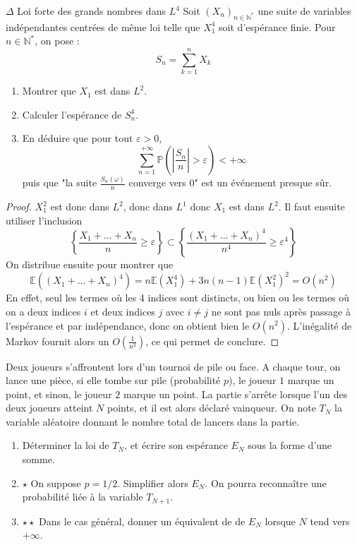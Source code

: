 \documentclass[french,a4paper]{article}
\renewcommand{\P}{\mathbb{P}}
\newcommand{\N}{\mathbb{N}}
\newcommand{\st}{^*}
\newcommand{\E}{\mathbb{E}}
\theoremstyle{plain}
\theoremstyle{definition}
\theoremstyle{remark}
\begin{document}
\begin{ex}[Moulin.81]{$\Delta$ Loi forte des grands nombres dans $L^4$}
	Soit $(X_n)_{n\in\N\st}$ une suite de variables indépendantes centrées de même loi telle que $X_1^4$ soit d'espérance finie. Pour $n\in\N\st$, on pose : $$S_n=\sum_{k=1}^{n}X_k$$
	\begin{enumerate}
		\item Montrer que $X_1$ est dans $L^2$.
		\item Calculer l'espérance de $S_n^4$.
		\item En déduire que pour tout $\varepsilon>0$, $$\sum_{n=1}^{+\infty}\P\left(\left\lvert\frac{S_n}{n}\right\rvert>\varepsilon\right)<+\infty$$ puis que "la suite $\displaystyle\frac{S_n(\omega)}{n}$ converge vers $0$" est un événement presque sûr. 
	\end{enumerate}
\end{ex}
\begin{proof}
	$X_1^2$ est donc dans $L^2$, donc dans $L^1$ donc $X_1$ est dans $L^2$. Il faut ensuite utiliser l'inclusion $$\left\{\frac{X_1+\ldots+X_n}{n}\geqslant\varepsilon\right\}\subset \left\{\frac{\left(X_1+\ldots+X_n\right)^4}{n^4}\geqslant\varepsilon^4\right\}$$ On distribue ensuite pour montrer que  $$\E\left((X_1+\ldots+X_n)^4\right)=n\E(X_1^4)+3n(n-1)\E(X_1^2)^2=O(n^2)$$ En effet, seul les termes où les 4 indices sont distincts, ou bien ou les termes où on a deux indices $i$ et deux indices $j$ avec $i\ne j$ ne sont pas nuls après passage à l'espérance et par indépendance, donc on obtient bien le $O(n^2)$. L'inégalité de Markov fournit alors un $O\left(\displaystyle\frac{1}{n^2}\right)$, ce qui permet de conclure.
\end{proof}

\begin{ex}[Moulin.82]{}
	Deux joueurs s'affrontent lors d'un tournoi de pile ou face. A chaque tour, on lance une pièce, si elle tombe sur pile (probabilité $p$), le joueur $1$ marque un point, et sinon, le joueur $2$ marque un point. La partie s'arrête lorsque l'un des deux joueurs atteint $N$ points, et il est alors déclaré vainqueur. On note $T_N$ la variable aléatoire donnant le nombre total de lancers dans la partie.
	\begin{enumerate}
		\item Déterminer la loi de $T_N$, et écrire son espérance $E_N$ sous la forme d'une somme.
		\item $\star$ On suppose $p=1/2$. Simplifier alors $E_N$. On pourra reconnaître une probabilité liée à la variable $T_{N+1}$.
		\item $\star\star$ Dans le cas général, donner un équivalent de de $E_N$ lorsque $N$ tend vers $+\infty$.
	\end{enumerate}
\end{ex}
\end{document}
